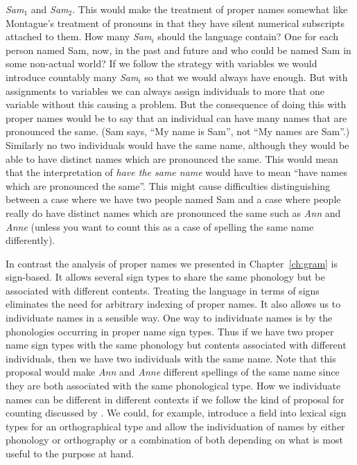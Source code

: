 \textit{Sam}$_1$ and \textit{Sam}$_2$.  This would make the treatment
of proper names somewhat like Montague's treatment of pronouns in that
they have silent numerical subscripts attached to them.  How many
\textit{Sam}$_i$ should the language contain? One for each person
named Sam, now, in the past and future and who could be named Sam in
some non-actual world?  If we follow the strategy with variables we
would introduce countably many \textit{Sam}$_i$ so that we would
always have enough.  But with assignments to variables we can always
assign individuals to more that one variable without this causing a
problem.  But the consequence of doing this with proper names would be
to say that an individual can have many names that are pronounced the
same.  (Sam says, ``My name is Sam'', not ``My names are Sam''.) Similarly no two individuals would have the same name, although
they would be able to have distinct names which are pronounced the
same.  This would mean that the interpretation of \textit{have the
  same name} would have to mean ``have names which are pronounced the
same''.  This might cause difficulties distinguishing between a case
where we have two people named Sam and a case where people really do
have distinct names which are pronounced the same such as \textit{Ann}
and \textit{Anne} (unless you want to count this as a case of spelling
the same name differently).

In contrast the analysis of proper names we presented in
Chapter~\ref{ch:gram} is sign-based.  It allows several sign types to
share the same phonology but be associated with different contents.
Treating the language in terms of signs eliminates the need for
arbitrary indexing of proper names.  It also allows us to individuate
names in a sensible way.  One way to individuate names is by the
phonologies occurring in proper name sign types.  Thus if we have two
proper name sign types with the same phonology but contents associated
with different individuals, then we have two individuals with the same
name.  Note that this proposal would make \textit{Ann} and
\textit{Anne} different spellings of the same name since they are both
associated with the same phonological type.  How we individuate names
can be different in different contexts if we follow the kind of
proposal for counting discussed by \cite{Cooper2011}.  We could, for
example, introduce a field into lexical sign types for an
orthographical type and allow the individuation of names by either
phonology or orthography or a combination of both depending on what is
most useful to the purpose at hand.

